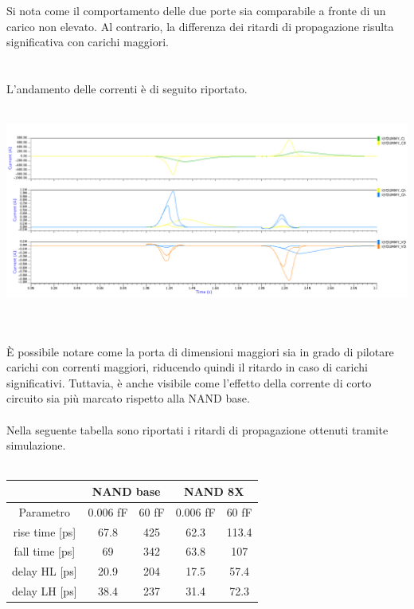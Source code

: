 \documentclass[11pt,  english, makeidx, a4paper, titlepage, oneside]{book}
\begin{document}
\\\\
Si nota come il comportamento delle due porte sia comparabile a fronte di un carico non elevato. Al contrario, la differenza dei ritardi di propagazione risulta significativa con carichi maggiori. 
\\\\\\
L'andamento delle correnti è di seguito riportato.
\\\\
\centerline{\includegraphics[width=14cm]{./img/Lab_5/waveform_5.png}}
\\\\
È possibile notare come la porta di dimensioni maggiori sia in grado di pilotare carichi con correnti maggiori, riducendo quindi il ritardo in caso di carichi significativi. Tuttavia, è anche visibile come l'effetto della corrente di corto circuito sia più marcato rispetto alla NAND base.
\\\\
Nella seguente tabella sono riportati i ritardi di propagazione ottenuti tramite simulazione.
\\\\
\begin{center}
	\begin{tabular}{|c|c|c||c|c|}
	\hline
	& \multicolumn{2}{|c||}{NAND base} & \multicolumn{2}{|c|}{NAND 8X}\\
	\hline
	Parametro & 0.006 fF & 60 fF & 0.006 fF & 60 fF \\
	\hline
	rise time [ps] & 67.8 & 425 & 62.3 & 113.4\\
	\hline
	 fall time [ps] & 69 & 342 & 63.8 & 107 \\
	\hline
	delay HL [ps] & 20.9 & 204 & 17.5 & 57.4  \\
	\hline
	delay LH [ps] & 38.4 & 237 & 31.4 & 72.3 \\
	\hline
	\end{tabular}	
\end{center}
\end{document}
